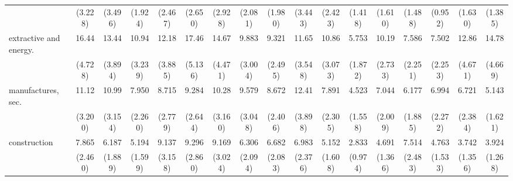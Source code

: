 {\begin{tabular}{l*{16}{c}}
                    &     (3.228)         &     (3.496)         &     (1.924)         &     (2.467)         &     (2.650)         &     (2.928)         &     (2.081)         &     (1.980)         &     (3.443)         &     (2.423)         &     (1.418)         &     (1.610)         &     (1.488)         &     (0.952)         &     (1.630)         &     (1.385)         \\
[1em]
extractive and energy.&       16.44\sym{***}&       13.44\sym{***}&       10.94\sym{***}&       12.18\sym{***}&       17.46\sym{***}&       14.67\sym{***}&       9.883\sym{***}&       9.321\sym{***}&       11.65\sym{***}&       10.86\sym{***}&       5.753\sym{***}&       10.19\sym{***}&       7.586\sym{***}&       7.502\sym{***}&       12.86\sym{***}&       14.78\sym{***}\\
                    &     (4.728)         &     (3.894)         &     (3.239)         &     (3.885)         &     (5.136)         &     (4.471)         &     (3.004)         &     (2.495)         &     (3.548)         &     (3.073)         &     (1.872)         &     (2.733)         &     (2.251)         &     (2.253)         &     (4.671)         &     (4.669)         \\
[1em]
manufactures, sec.  &       11.12\sym{***}&       10.99\sym{***}&       7.950\sym{***}&       8.715\sym{***}&       9.284\sym{***}&       10.28\sym{***}&       9.579\sym{***}&       8.672\sym{***}&       12.41\sym{***}&       7.891\sym{***}&       4.523\sym{***}&       7.044\sym{***}&       6.177\sym{***}&       6.994\sym{***}&       6.721\sym{***}&       5.143\sym{***}\\
                    &     (3.200)         &     (3.154)         &     (2.260)         &     (2.779)         &     (2.644)         &     (3.160)         &     (3.048)         &     (2.406)         &     (3.898)         &     (2.305)         &     (1.558)         &     (2.009)         &     (1.885)         &     (2.272)         &     (2.384)         &     (1.621)         \\
[1em]
construction        &       7.865\sym{***}&       6.187\sym{***}&       5.194\sym{***}&       9.137\sym{***}&       9.296\sym{***}&       9.169\sym{***}&       6.306\sym{***}&       6.682\sym{***}&       6.983\sym{***}&       5.152\sym{***}&       2.833\sym{**} &       4.691\sym{***}&       7.514\sym{***}&       4.763\sym{***}&       3.742\sym{***}&       3.924\sym{***}\\
                    &     (2.460)         &     (1.889)         &     (1.599)         &     (3.158)         &     (2.860)         &     (3.024)         &     (2.094)         &     (2.083)         &     (2.376)         &     (1.608)         &     (0.974)         &     (1.366)         &     (2.483)         &     (1.533)         &     (1.356)         &     (1.268)         \\

\end{tabular}}

